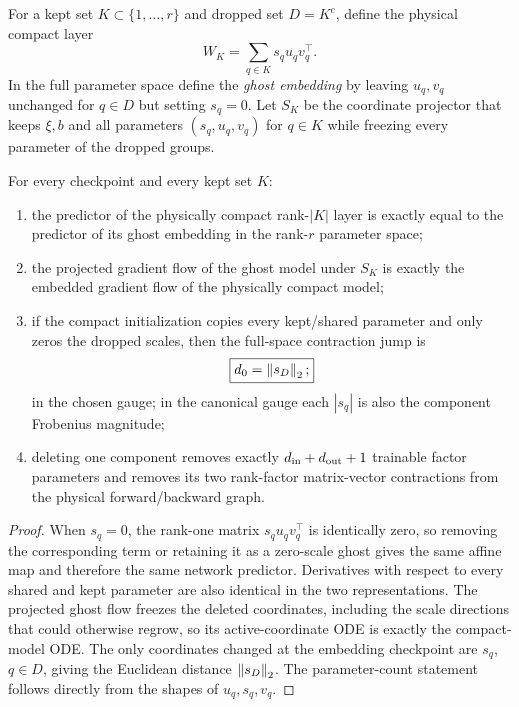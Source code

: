 For a kept set $K\subset\{1,\ldots,r\}$ and dropped set $D=K^c$, define the physical compact layer
\[
W_K=\sum_{q\in K}s_qu_qv_q^\top.
\]
In the full parameter space define the \emph{ghost embedding} by leaving $u_q,v_q$ unchanged for $q\in D$ but setting $s_q=0$. Let $S_K$ be the coordinate projector that keeps $\xi,b$ and all parameters $(s_q,u_q,v_q)$ for $q\in K$ while freezing every parameter of the dropped groups.

\begin{theorem}\label{thm:rank-factor-embedding}
For every checkpoint and every kept set $K$:
\begin{enumerate}[label=(\roman*)]
\item the predictor of the physically compact rank-$|K|$ layer is exactly equal to the predictor of its ghost embedding in the rank-$r$ parameter space;
\item the projected gradient flow of the ghost model under $S_K$ is exactly the embedded gradient flow of the physically compact model;
\item if the compact initialization copies every kept/shared parameter and only zeros the dropped scales, then the full-space contraction jump is
\[
\boxed{
d_0=\left\lVert s_D\right\rVert_2;}
\]
in the chosen gauge; in the canonical gauge each $|s_q|$ is also the component Frobenius magnitude;
\item deleting one component removes exactly $d_{\rm in}+d_{\rm out}+1$ trainable factor parameters and removes its two rank-factor matrix-vector contractions from the physical forward/backward graph.
\end{enumerate}
\end{theorem}

\begin{proof}
When $s_q=0$, the rank-one matrix $s_qu_qv_q^\top$ is identically zero, so removing the corresponding term or retaining it as a zero-scale ghost gives the same affine map and therefore the same network predictor. Derivatives with respect to every shared and kept parameter are also identical in the two representations. The projected ghost flow freezes the deleted coordinates, including the scale directions that could otherwise regrow, so its active-coordinate ODE is exactly the compact-model ODE. The only coordinates changed at the embedding checkpoint are $s_q$, $q\in D$, giving the Euclidean distance $\left\lVert s_D\right\rVert_2$. The parameter-count statement follows directly from the shapes of $u_q,s_q,v_q$.
\end{proof}

